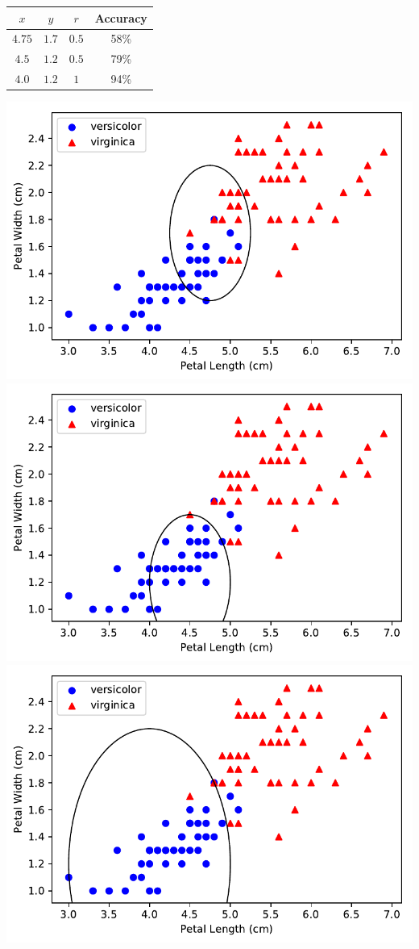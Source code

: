 \documentclass[letterpaper]{article}
\begin{document}
\begin{center}
\begin{tabular}{|c|c|c|c|}
\hline
$x$ & $y$ & $r$ & Accuracy\\
\hline\hline
$4.75$ & $1.7$ & $0.5$ & 58\%\\
\hline
$4.5$ & $1.2$ & $0.5$ & 79\%\\
\hline
$4.0$ & $1.2$ & $1$ & 94\%\\
\hline
\end{tabular}
\includegraphics{plot_1d_1.pdf}
\includegraphics{plot_1d_2.pdf}
\includegraphics{plot_1d_3.pdf}
\end{center}
\end{document}
